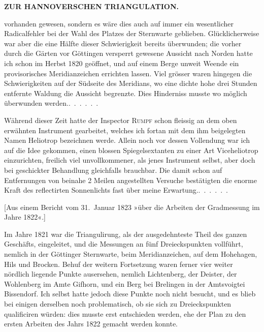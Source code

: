 \noindent\null\hfill{\small\textbf{ZUR HANNOVERSCHEN TRIANGULATION.}}\hfill{}\par\medskip
\noindent vorhanden gewesen, sondern es wäre dies auch auf immer ein wesentlicher
Radicalfehler bei der Wahl des Platzes der Sternwarte geblieben. Glücklicherweise
war aber die eine Hälfte dieser Schwierigkeit bereits überwunden;
die vorher durch die Gärten vor Göttingen versperrt gewesene Aussicht nach
Norden hatte ich schon im Herbst 1820 geöffnet, und auf einem Berge unweit
Weende ein provisorisches Meridianzeichen errichten lassen. Viel grösser
waren hingegen die Schwierigkeiten auf der Südseite des Meridians, wo eine
dichte hohe drei Stunden entfernte Waldung die Aussicht begrenzte. Dies
Hinderniss musste wo möglich überwunden \mbox{werden.\enspace\mbox{.\ .\ .\ .\ .\ .}}

\par\noindent\hspace*{\parindent}Während dieser Zeit hatte der Inspector \textsc{Rumpf} schon fleissig an dem
oben erwähnten Instrument gearbeitet, welches ich fortan mit dem ihm beigelegten
Namen Heliotrop bezeichnen werde. Allein noch vor dessen Vollendung
war ich auf die Idee gekommen, einen blossen Spiegelsextanten zu
einer Art Viceheliotrop einzurichten, freilich viel unvollkommener, als jenes
Instrument selbst, aber doch bei geschickter Behandlung gleichfalls brauchbar.
Die damit schon auf Entfernungen von beinahe 2 Meilen angestellten Versuche
bestätigten die enorme Kraft des reflectirten Sonnenlichts fast über
meine \mbox{Erwartung.\enspace\mbox{.\ .\ .\ .\ .\ .}}
\par\bigskip

\begin{center}
[Aus einem Bericht vom 31.~Januar 1823 »über die Arbeiten der Gradmessung im Jahre 1822«.]
\end{center}

\par\noindent\hspace*{\parindent}Im Jahre 1821 war die Triangulirung, als der ausgedehnteste Theil des
ganzen Geschäfts, eingeleitet, und die Messungen an fünf Dreieckspunkten
vollführt, nemlich in der Göttinger Sternwarte, beim Meridianzeichen, auf dem
Hohehagen, Hils und Brocken. Behuf der weitern Fortsetzung waren ferner
vier weiter nördlich liegende Punkte ausersehen, nemlich Lichtenberg, der
Deister, der Wohlenberg im Amte Gifhorn, und ein Berg bei Brelingen
in der Amtsvoigtei Bissendorf. Ich selbst hatte jedoch diese Punkte noch
nicht besucht, und es blieb bei einigen derselben noch problematisch, ob sie
sich zu Dreieckspunkten qualificiren würden: dies musste erst entschieden
werden, ehe der Plan zu den ersten Arbeiten des Jahrs 1822 gemacht werden
konnte.

